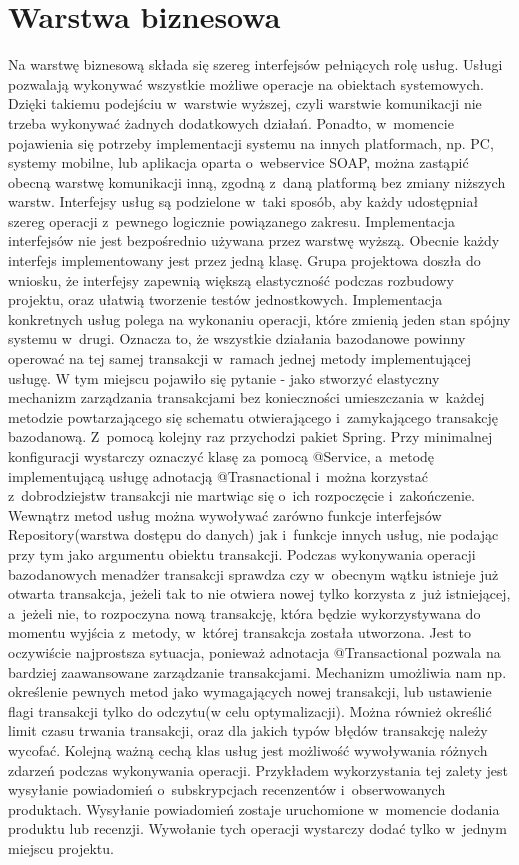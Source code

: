 \section{Warstwa biznesowa}

Na warstwę biznesową składa się szereg interfejsów pełniących rolę usług. Usługi pozwalają wykonywać wszystkie możliwe operacje na obiektach systemowych. Dzięki takiemu podejściu w~warstwie wyższej, czyli warstwie komunikacji nie trzeba wykonywać żadnych dodatkowych działań. Ponadto, w~momencie pojawienia się potrzeby implementacji systemu na innych platformach, np. PC, systemy mobilne, lub aplikacja oparta o~webservice SOAP, można zastąpić obecną warstwę komunikacji inną, zgodną z~daną platformą bez zmiany niższych warstw.
Interfejsy usług są podzielone w~taki sposób, aby każdy udostępniał szereg operacji z~pewnego logicznie powiązanego zakresu. Implementacja interfejsów nie jest bezpośrednio używana przez warstwę wyższą. Obecnie każdy interfejs implementowany jest przez jedną klasę. Grupa projektowa doszła do wniosku, że interfejsy zapewnią większą elastyczność podczas rozbudowy projektu, oraz ułatwią tworzenie testów jednostkowych.
Implementacja konkretnych usług polega na wykonaniu operacji, które zmienią jeden stan spójny systemu w~drugi. Oznacza to, że wszystkie działania bazodanowe powinny operować na tej samej transakcji w~ramach jednej metody implementującej usługę. W tym miejscu pojawiło się pytanie - jako stworzyć elastyczny mechanizm zarządzania transakcjami bez konieczności umieszczania w~każdej metodzie powtarzającego się schematu otwierającego i~zamykającego transakcję bazodanową. Z~pomocą kolejny raz przychodzi pakiet Spring. Przy minimalnej konfiguracji wystarczy oznaczyć klasę za pomocą @Service, a~metodę implementującą usługę adnotacją @Trasnactional i~można korzystać z~dobrodziejstw transakcji nie martwiąc się o~ich rozpoczęcie i~zakończenie. Wewnątrz metod usług można wywoływać zarówno funkcje interfejsów Repository(warstwa dostępu do danych) jak i~funkcje innych usług, nie podając przy tym jako argumentu obiektu transakcji. Podczas wykonywania operacji bazodanowych menadżer transakcji sprawdza czy w~obecnym wątku istnieje już otwarta transakcja, jeżeli tak to nie otwiera nowej tylko korzysta z~już istniejącej, a~jeżeli nie, to rozpoczyna nową transakcję, która będzie wykorzystywana do momentu wyjścia z~metody, w~której transakcja została utworzona. Jest to oczywiście najprostsza sytuacja, ponieważ adnotacja @Transactional pozwala na bardziej zaawansowane zarządzanie transakcjami. Mechanizm umożliwia nam np. określenie pewnych metod jako wymagających nowej transakcji, lub ustawienie flagi transakcji tylko do odczytu(w celu optymalizacji). Można również określić limit czasu trwania transakcji, oraz dla jakich typów błędów transakcję należy wycofać. 
Kolejną ważną cechą klas usług jest możliwość wywoływania różnych zdarzeń podczas wykonywania operacji. Przykładem wykorzystania tej zalety jest wysyłanie powiadomień o~subskrypcjach recenzentów i~obserwowanych produktach. Wysyłanie powiadomień zostaje uruchomione w~momencie dodania produktu lub recenzji. Wywołanie tych operacji wystarczy dodać tylko w~jednym miejscu projektu.

